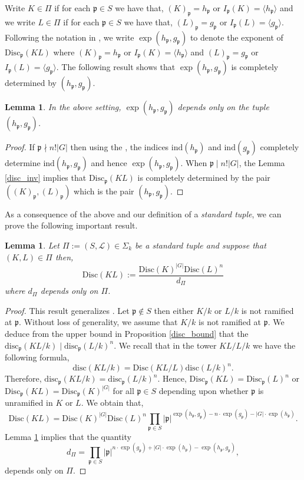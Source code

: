 \documentclass[11pt]{amsart}
\newtheorem{Lemma}[theorem]{Lemma}
\newcommand{\fp}{\mathfrak{p}}
\newcommand{\disc}{\mathrm{Disc}}
\newcommand{\rdisc}{\mathrm{disc}}
\newcommand{\ind}{\mathrm{ind}}
\numberwithin{equation}{section}
\begin{document}
Write $K \in \Pi$ if for each $\fp \in S$ we have that, $(K)_{\fp} = h_{\fp}\text{ or }I_{\fp}(K) = \langle h_{\fp}\rangle$ and we write $L \in \Pi$ if for each $\fp \in S$ we have that, $(L)_{\fp} = g_{\fp}\text{ or }I_{\fp}(L) = \langle g_{\fp}\rangle$. Following the notation in \cite{Wang2020}, we write $\exp(h_{\fp}, g_{\fp})$ to denote the exponent of $\disc_{\fp}(KL)$ where $(K)_{\fp} = h_{\fp}$ or $I_{\fp}(K) = \langle h_{\fp}\rangle$ and $(L)_{\fp} = g_{\fp}$ or $I_{\fp}(L) = \langle g_{\fp}\rangle$. The following result shows that $\exp(h_{\fp}, g_{\fp})$ is completely determined by $(h_{\fp}, g_{\fp})$.
\begin{Lemma}\label{exp Lemma}
    In the above setting, $\exp(h_{\fp}, g_{\fp})$ depends only on the tuple $(h_{\fp}, g_{\fp})$.
\end{Lemma}
\begin{proof}
    If $\fp \nmid n!|G|$ then using the \cite[Theorem 2.3]{Wang2020}, the indices $\ind(h_{\fp})$ and $\ind(g_{\fp})$ completely determine $\ind(h_{\fp}, g_{\fp})$ and hence $\exp(h_{\fp}, g_{\fp})$. When $\fp \mid n!|G|$, the Lemma \ref{disc_inv} implies that $\disc_{\fp}(KL)$ is completely determined by the pair $((K)_{\fp}, (L)_{\fp})$ which is the pair $(h_{\fp}, g_{\fp})$.
\end{proof}
As a consequence of the above and our definition of a \textit{standard tuple}, we can prove the following important result.
\begin{Lemma}\label{disc inv 2}
    Let $\Pi:= (S, \mathcal{L}) \in \Sigma_k$ be a standard tuple and suppose that $(K,L) \in \Pi$ then,
    \[
    \disc(KL):=\frac{\disc(K)^{|G|}\disc(L)^n}{d_{\Pi}}
    \]
    where $d_{\Pi}$ depends only on $\Pi$.
\end{Lemma}
\begin{proof}
    This result generalizes \cite[equation (5.11)]{Wang2020}. Let $\fp \notin S$ then either $K/k$ or $L/k$ is not ramified at $\fp$. Without loss of generality, we assume that $K/k$ is not ramified at $\fp$. We deduce from the upper bound in Proposition \ref{disc_bound} that the $\rdisc_{\fp}(KL/k) \mid \rdisc_{\fp}(L/k)^n$. We recall that in the tower $KL/L/k$ we have the following formula,
    \[
    \rdisc(KL/k) = \disc(KL/L)\rdisc(L/k)^n.
    \]
    Therefore, $\rdisc_{\fp}(KL/k) = \rdisc_{\fp}(L/k)^n$. Hence, $\disc_{\fp}(KL) = \disc_{\fp}(L)^n$ or $\disc_{\fp}(KL) = \disc_{\fp}(K)^{|G|}$ for all $\fp \in S$ depending upon whether $\fp$ is unramified in $K$ or $L$. We obtain that,
    \[
    \disc(KL) = \disc(K)^{|G|}\disc(L)^n\prod_{\fp \in S}|\fp|^{\exp(h_{\fp},g_{\fp})-n\cdot\exp(g_{\fp})-|G|\cdot \exp(h_{\fp})}.
    \]
 Lemma \ref{exp Lemma} implies that the quantity
    \[d_{\Pi} = \prod_{\fp \in S}|\fp|^{n\cdot\exp(g_{\fp})+|G|\cdot \exp(h_{\fp})-\exp(h_{\fp},g_{\fp})},\]
    depends only on $\Pi$.
\end{proof}
\end{document}
